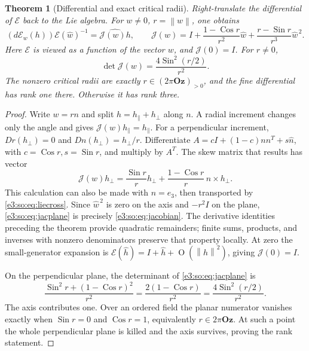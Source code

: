 \documentclass[11pt,letterpaper]{article}
\numberwithin{equation}{section}
\newtheorem{theorem}{Theorem}[section]
\theoremstyle{definition}
\theoremstyle{remark}
\newcommand{\Oz}{\mathbf{Oz}}
\newcommand{\Sin}{\operatorname{Sin}}
\newcommand{\Cos}{\operatorname{Cos}}
\newcommand{\norm}[1]{\left\lVert#1\right\rVert}
\newcommand{\smallO}{\operatorname{O}}
\begin{document}
\begin{theorem}[Differential and exact critical radii]\label{e3:so:thm:expdifferential}
Right-translate the differential of \(\mathcal E\) back to the Lie algebra. For
\(w\ne0\), \(r=\norm w\), one obtains
\begin{equation}\label{e3:so:eq:jacobian}
 (d\mathcal E_w(h))\mathcal E(\widehat w)^{-1}=\widehat{\mathcal J(w)h},
 \qquad
 \mathcal J(w)=I+\frac{1-\Cos r}{r^2}\widehat w
          +\frac{r-\Sin r}{r^3}\widehat w^{\,2}.
\end{equation}
Here \(\mathcal E\) is viewed as a function of the vector \(w\), and \(\mathcal J(0)=I\).
For \(r\ne0\),
\begin{equation}\label{e3:so:eq:jacdet}
 \det \mathcal J(w)=\frac{4\Sin^2(r/2)}{r^2}.
\end{equation}
The nonzero critical radii are exactly \(r\in(2\pi\Oz)_{>0}\), and the
fine differential has rank one there. Otherwise it has rank three.
\end{theorem}
\begin{proof}
Write \(w=rn\) and split \(h=h_{\parallel}+h_{\perp}\) along \(n\).
A radial increment changes only the angle and gives
\(\mathcal J(w)h_{\parallel}=h_{\parallel}\). For a perpendicular increment,
\(Dr(h_{\perp})=0\) and \(Dn(h_{\perp})=h_{\perp}/r\).
Differentiate
\(A=cI+(1-c)nn^T+s\widehat n\), with \(c=\Cos r,s=\Sin r\), and multiply by
\(A^T\). The skew matrix that results has vector
\begin{equation}\label{e3:so:eq:jacplane}
 \mathcal J(w)h_{\perp}=\frac{\Sin r}{r}h_{\perp}
                 +\frac{1-\Cos r}{r}\,n\times h_{\perp}.
\end{equation}
This calculation can also be made with \(n=e_3\), then transported by
\cref{e3:so:eq:liecross}. Since \(\widehat w^{\,2}\) is zero on the axis and
\(-r^2I\) on the plane, \cref{e3:so:eq:jacplane} is precisely \cref{e3:so:eq:jacobian}.
The derivative identities preceding the theorem provide quadratic remainders;
finite sums, products, and inverses with nonzero denominators preserve that
property locally. At zero the small-generator expansion is
\(\mathcal E(\widehat h)=I+\widehat h+\smallO(\norm h^2)\), giving \(\mathcal J(0)=I\).

On the perpendicular plane, the determinant of \cref{e3:so:eq:jacplane} is
\[
 \frac{\Sin^2r+(1-\Cos r)^2}{r^2}
 =\frac{2(1-\Cos r)}{r^2}
 =\frac{4\Sin^2(r/2)}{r^2}.
\]
The axis contributes one. Over an ordered field the planar numerator vanishes
exactly when \(\Sin r=0\) and \(\Cos r=1\), equivalently
\(r\in2\pi\Oz\). At such a point the whole perpendicular plane is killed and
the axis survives, proving the rank statement.
\end{proof}
\end{document}
